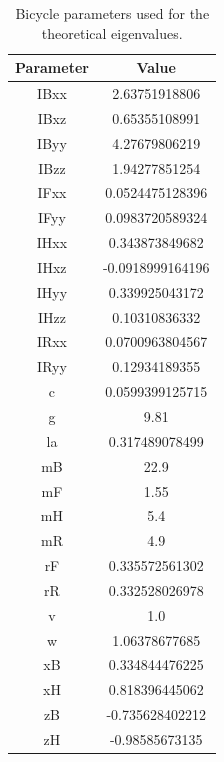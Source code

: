 \documentclass[12pt]{article}
\begin{document}
\begin{table}
    \centering
    \caption{Bicycle parameters used for the theoretical eigenvalues.} \label{table-bicycle-parameters}
    \begin{tabular}{c|c}
        \textbf{Parameter} & \textbf{Value}   \\ \hline
        IBxx               & 2.63751918806    \\
        IBxz               & 0.65355108991    \\
        IByy               & 4.27679806219    \\
        IBzz               & 1.94277851254    \\
        IFxx               & 0.0524475128396  \\
        IFyy               & 0.0983720589324  \\
        IHxx               & 0.343873849682   \\
        IHxz               & -0.0918999164196 \\
        IHyy               & 0.339925043172   \\
        IHzz               & 0.10310836332    \\
        IRxx               & 0.0700963804567  \\
        IRyy               & 0.12934189355    \\
        c                  & 0.0599399125715  \\
        g                  & 9.81             \\
        la                 & 0.317489078499   \\
        mB                 & 22.9             \\
        mF                 & 1.55             \\
        mH                 & 5.4              \\
        mR                 & 4.9              \\
        rF                 & 0.335572561302   \\
        rR                 & 0.332528026978   \\
        v                  & 1.0              \\
        w                  & 1.06378677685    \\
        xB                 & 0.334844476225   \\
        xH                 & 0.818396445062   \\
        zB                 & -0.735628402212  \\
        zH                 & -0.98585673135
    \end{tabular}
\end{table}
\end{document}
